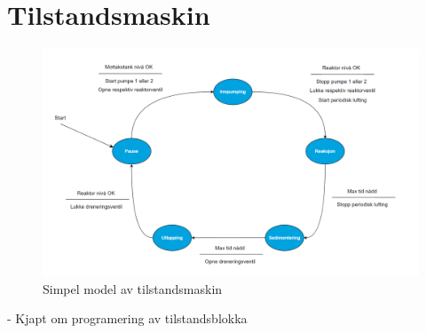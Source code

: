 \section{Tilstandsmaskin}
\thispagestyle{fancy}

\begin{figure}[htbp]
    \centering
    \includegraphics[width=1\textwidth]{Figurar/Simpel tilstandsmaskin.png}
    \caption{Simpel model av tilstandsmaskin}\label{fig:reaktorsoner}
\end{figure}


- Kjapt om programering av tilstandsblokka